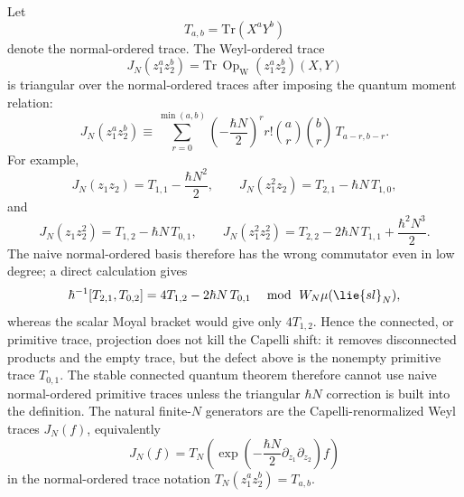 \documentclass[11pt]{memoir}
\begin{document}
\begin{rmk}\label{rmk:capelli-renormalized-traces}
  Let
  $$T_{a,b}=\mathrm{Tr}(X^aY^b)$$
  denote the normal-ordered trace. The Weyl-ordered trace
  $$J_N(z_1^az_2^b)=\mathrm{Tr}\,\operatorname{Op}_{\mathrm W}(z_1^az_2^b)(X,Y)$$
  is triangular over the normal-ordered traces after imposing the quantum
  moment relation:
  $$J_N(z_1^az_2^b)\equiv
    \sum_{r=0}^{\min(a,b)}
      \left(-\frac{\hbar N}{2}\right)^r
      r!\binom ar\binom br\,T_{a-r,b-r}.$$
  For example,
  $$J_N(z_1z_2)=T_{1,1}-\frac{\hbar N^2}{2},\qquad
    J_N(z_1^2z_2)=T_{2,1}-\hbar N\,T_{1,0},$$
  and
  $$J_N(z_1z_2^2)=T_{1,2}-\hbar N\,T_{0,1},\qquad
    J_N(z_1^2z_2^2)=T_{2,2}-2\hbar N\,T_{1,1}
      +\frac{\hbar^2N^3}{2}.$$
  The naive normal-ordered basis therefore has the wrong commutator even in low
  degree; a direct calculation gives
  $$\hbar^{-1}[T_{2,1},T_{0,2}]
    =4T_{1,2}-2\hbar N\,T_{0,1}
    \quad\bmod\ \mathcal W_N\widehat\mu(\lie{sl}_N),$$
  whereas the scalar Moyal bracket would give only $4T_{1,2}$. Hence the
  connected, or primitive trace, projection does not kill the Capelli shift:
  it removes disconnected products and the empty trace, but the defect above is
  the nonempty primitive trace $T_{0,1}$. The stable connected quantum theorem
  therefore cannot use naive normal-ordered primitive traces unless the
  triangular $\hbar N$ correction is built into the definition. The natural
  finite-$N$ generators are the Capelli-renormalized Weyl traces $J_N(f)$,
  equivalently
  $$J_N(f)=T_N\left(
    \exp\left(-\frac{\hbar N}{2}\partial_{z_1}\partial_{z_2}\right)f
  \right)$$
  in the normal-ordered trace notation $T_N(z_1^az_2^b)=T_{a,b}$.
\end{rmk}
\end{document}
